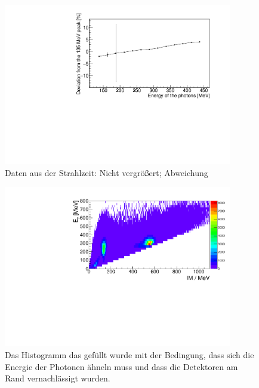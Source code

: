\documentclass[a4paper,11pt,oneside,final,german,openbib,pdftex]{scrbook}
\begin{document}
{\begin{appendix}
\begin{figure}[h!]
	\begin{center}
		\includegraphics[width=100mm]{201728104StrahlzeitNoCutUnzoomed}
		\caption[Strahlzeit: Unzoomed Abweichung]{Daten aus der Strahlzeit: Nicht vergrößert; Abweichung}
		\label{fig:Unzoomed}
	\end{center}
\end{figure}




\begin{figure}[h!]
	\begin{center}
		\includegraphics[width=100mm]{NewCalib/Strahlzeit2014/20171904Real30DegreeCutHist}
		\caption[Strahlzeit: 2D-Hist ohne Detektoren am Rand]{Das Histogramm das gef\"ullt wurde mit der Bedingung, dass sich die Energie der Photonen \"ahneln muss und dass die Detektoren am Rand vernachl\"assigt wurden.}
		\label{fig:30-Degree-Cut-Histogramm}
	\end{center}
\end{figure}



\end{appendix}}
\end{document}
